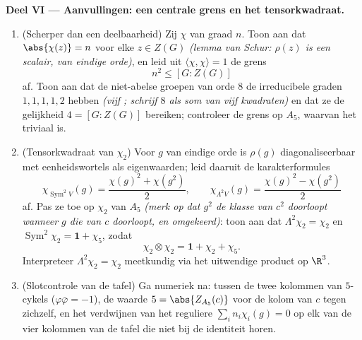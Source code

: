 \begin{problem}
\medskip
\noindent\textbf{Deel VI --- Aanvullingen: een centrale grens en
het tensorkwadraat.}
\begin{enumerate}[resume]
  \item (Scherper dan een deelbaarheid) Zij $\chi$  van
        graad $n$. Toon aan dat $\abs{\chi(z)} = n$ voor elke $z
        \in Z(G)$ \emph{(lemma van Schur: $\rho(z)$ is een
        scalair, van eindige orde)}, en leid uit $\langle\chi,
        \chi\rangle = 1$ de grens
        \[
        n^2 \leq [G : Z(G)]
        \]
        af. Toon aan dat de niet-abelse groepen van orde $8$ de
        irreducibele graden $1, 1, 1, 1, 2$ hebben \emph{(vijf
        ; schrijf $8$ als som van vijf
        kwadraten)} en dat ze de gelijkheid $4 = [G : Z(G)]$
        bereiken; controleer de grens op $A_5$, waarvan het
         triviaal is.
  \item (Tensorkwadraat van $\chi_2$) Voor $g$ van eindige orde is
        $\rho(g)$ diagonaliseerbaar met eenheidswortels als
        eigenwaarden; leid daaruit de karakterformules
        \[
        \chi_{\operatorname{Sym}^2 V}(g)
        = \frac{\chi(g)^2 + \chi(g^2)}2,
        \qquad
        \chi_{\Lambda^2 V}(g)
        = \frac{\chi(g)^2 - \chi(g^2)}2
        \]
        af. Pas ze toe op $\chi_2$ van $A_5$ \emph{(merk op dat
        $g^2$ de klasse van $c^2$ doorloopt wanneer $g$ die van
        $c$ doorloopt, en omgekeerd)}: toon aan dat
        $\Lambda^2\chi_2 = \chi_2$ en $\operatorname{Sym}^2\chi_2 =
        \mathbf 1 + \chi_5$, zodat
        \[
        \chi_2\otimes\chi_2 = \mathbf 1 + \chi_2 + \chi_5 .
        \]
        Interpreteer $\Lambda^2\chi_2 = \chi_2$ meetkundig via het
        uitwendige product op $\R^3$.
  \item (Slotcontrole van de tafel) Ga numeriek na:
         tussen de twee kolommen van
        $5$-cykels ($\varphi\bar\varphi = -1$), de waarde $5 =
        \abs{Z_{A_5}(c)}$ voor de kolom van $c$ tegen zichzelf, en
        het verdwijnen van het reguliere  $\sum_i
        n_i\chi_i(g) = 0$ op elk van de vier kolommen van de tafel
        die niet bij de identiteit horen.
\end{enumerate}
\end{problem}
